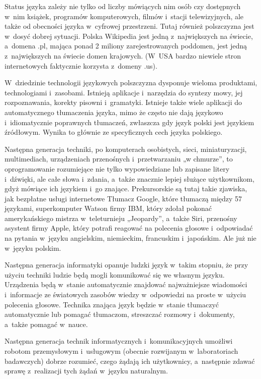 \begin{multicols}{2}
Status języka zależy nie tylko od liczby mówiących nim osób czy
dostępnych w~nim książek, programów komputerowych, filmów
i~stacji telewizyjnych, ale także od obecności języka w~cyfrowej
przestrzeni. Tutaj również polszczyzna jest w~dosyć dobrej
sytuacji. Polska Wikipedia jest jedną z~największych na świecie,
a~domena .pl, mająca ponad 2 miliony zarejestrowanych poddomen, jest
jedną z~największych na świecie domen krajowych. (W~USA bardzo
niewiele stron internetowych faktycznie korzysta z~domeny .us).

W~dziedzinie technologii językowych polszczyzna dysponuje wieloma
produktami, technologiami i~zasobami. Istnieją aplikacje i~narzędzia
do syntezy mowy, jej rozpoznawania, korekty pisowni i~gramatyki.
Istnieje także wiele aplikacji do automatycznego tłumaczenia
języka, mimo że często nie dają językowo i~idiomatycznie
poprawnych tłumaczeń, zwłaszcza gdy język polski jest językiem
źródłowym. Wynika to głównie ze specyficznych cech języka
polskiego. 


Następna generacja techniki, po komputerach osobistych, sieci,
miniaturyzacji, multimediach, urządzeniach przenośnych
i~przetwarzaniu „w chmurze”, to oprogramowanie rozumiejące nie
tylko wypowiedziane lub zapisane litery i~dźwięki, ale całe słowa
i~zdania, a~także znacznie lepiej służące użytkownikom, gdyż
mówiące ich językiem i~go znające. Prekursorskie są tutaj takie
zjawiska, jak bezpłatne usługi internetowe Tłumacz Google, które
tłumaczą między 57 językami, superkomputer Watson firmy IBM,
który zdołał pokonać amerykańskiego mistrza w~teleturnieju
„Jeopardy”, a~także Siri, przenośny asystent firmy Apple, który
potrafi reagować na polecenia głosowe i~odpowiadać na pytania
w~języku angielskim, niemieckim, francuskim i~japońskim. Ale już
nie w~języku polskim. 

Następna generacja informatyki opanuje ludzki język w~takim stopniu,
że przy użyciu techniki ludzie będą mogli komunikować się we
własnym języku. Urządzenia będą w~stanie automatycznie znajdować
najważniejsze wiadomości i~informacje ze światowych zasobów wiedzy
w~odpowiedzi na proste w~użyciu polecenia głosowe. Technika znająca
język będzie w~stanie tłumaczyć automatycznie lub pomagać
tłumaczom, streszczać rozmowy i~dokumenty, a~także pomagać
w~nauce. 

Następna generacja technik informatycznych i~komunikacyjnych
umożliwi robotom przemysłowym i~usługowym (obecnie rozwijanym
w~laboratoriach badawczych) dobrze rozumieć, czego żądają ich
użytkownicy, a~następnie zdawać sprawę z~realizacji tych żądań
w~języku naturalnym. 


\end{multicols}
